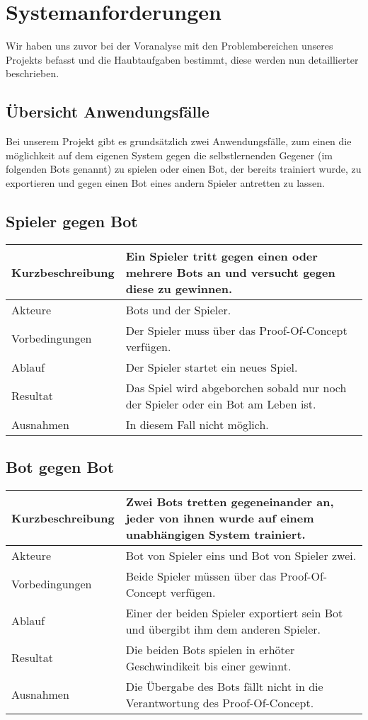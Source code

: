 \section{Systemanforderungen}

Wir haben uns zuvor bei der Voranalyse mit den Problembereichen unseres Projekts befasst und die Haubtaufgaben bestimmt, diese werden nun detaillierter beschrieben. 


\subsection{Übersicht Anwendungsfälle}

Bei unserem Projekt gibt es grundsätzlich zwei Anwendungsfälle, zum einen die möglichkeit auf dem eigenen System gegen die selbstlernenden Gegener (im folgenden Bots genannt) zu spielen oder einen Bot, der bereits trainiert wurde, zu exportieren und gegen einen Bot eines andern Spieler antretten zu lassen.

\subsection{Spieler gegen Bot}
\begin{tabularx}{\textwidth}{| X | X |}
	\hline
	Kurzbeschreibung & Ein Spieler tritt gegen einen oder mehrere Bots an und versucht gegen diese zu gewinnen. \\
	\hline
	Akteure & Bots und der Spieler. \\
	\hline
	Vorbedingungen & Der Spieler muss über das Proof-Of-Concept verfügen. \\
	\hline
	Ablauf & Der Spieler startet ein neues Spiel.\\
	\hline
	Resultat & Das Spiel wird abgeborchen sobald nur noch der Spieler oder ein Bot am Leben ist. \\
	\hline
	Ausnahmen & In diesem Fall nicht möglich. \\
	\hline	
\end{tabularx}

\subsection{Bot gegen Bot}
\begin{tabularx}{\textwidth}{| X | X |}
	\hline
	Kurzbeschreibung & Zwei Bots tretten gegeneinander an, jeder von ihnen wurde auf einem unabhängigen System trainiert. \\
	\hline
	Akteure & Bot von Spieler eins und Bot von Spieler zwei. \\
	\hline
	Vorbedingungen & Beide Spieler müssen über das Proof-Of-Concept verfügen. \\
	\hline
	Ablauf & Einer der beiden Spieler exportiert sein Bot und übergibt ihm dem anderen Spieler.\\
	\hline
	Resultat & Die beiden Bots spielen in erhöter Geschwindikeit bis einer gewinnt. \\
	\hline
	Ausnahmen & Die Übergabe des Bots fällt nicht in die Verantwortung des Proof-Of-Concept.\\
	\hline
\end{tabularx}
